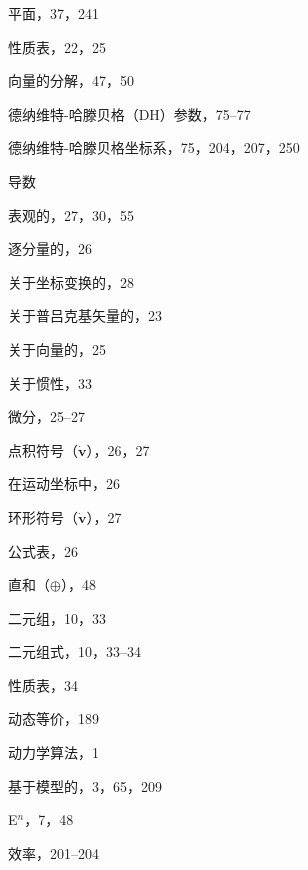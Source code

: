 \documentclass[10pt,a4paper]{book}
\theoremstyle{thmstyle} %
\theoremstyle{defstyle} %
\theoremstyle{prostyle} %
\begin{document}
平面，37，241



性质表，22，25



向量的分解，47，50



德纳维特-哈滕贝格（DH）参数，75–77



德纳维特-哈滕贝格坐标系，75，204，207，250



导数



表观的，27，30，55



逐分量的，26



关于坐标变换的，28



关于普吕克基矢量的，23



关于向量的，25



关于惯性，33



微分，25–27



点积符号（$\dot{\boldsymbol{v}}$），26，27



在运动坐标中，26



环形符号（$\dot{\boldsymbol{v}}$），27



公式表，26



直和（$\oplus$），48



二元组，10，33



二元组式，10，33–34



性质表，34



动态等价，189



动力学算法，1



基于模型的，3，65，209



E$^{n}$，7，48



效率，201–204
\end{document}

